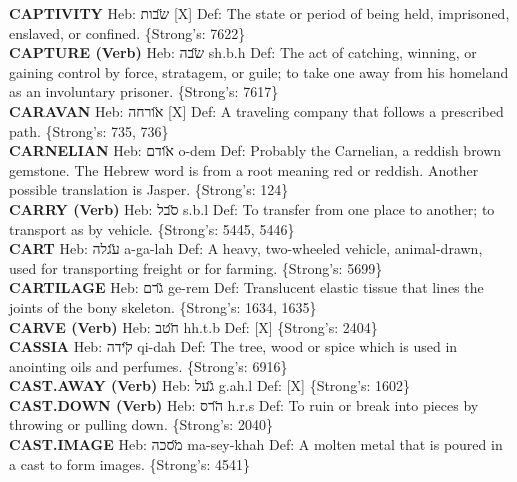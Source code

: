 {\textbf{CAPTIVITY} Heb: {\large\H שבות} {[}X{]} Def: The state or period of being held, imprisoned, enslaved, or confined. \{Strong's: 7622\}\hfill{}\\

\textbf{CAPTURE (Verb)} Heb: {\large\H שבה} sh.b.h Def: The act of catching, winning, or gaining control by force, stratagem, or guile; to take one away from his homeland as an involuntary prisoner. \{Strong's: 7617\}\hfill{}\\

\textbf{CARAVAN} Heb: {\large\H אורחה} {[}X{]} Def: A traveling company that follows a prescribed path. \{Strong's: 735, 736\}\hfill{}\\

\textbf{CARNELIAN} Heb: {\large\H אודם} o-dem Def: Probably the Carnelian, a reddish brown gemstone. The Hebrew word is from a root meaning red or reddish. Another possible translation is Jasper. \{Strong's: 124\}\hfill{}\\

\textbf{CARRY (Verb)} Heb: {\large\H סבל} s.b.l Def: To transfer from one place to another; to transport as by vehicle. \{Strong's: 5445, 5446\}\hfill{}\\

\textbf{CART} Heb: {\large\H עגלה} a-ga-lah Def: A heavy, two-wheeled vehicle, animal-drawn, used for transporting freight or for farming. \{Strong's: 5699\}\hfill{}\\

\textbf{CARTILAGE} Heb: {\large\H גרם} ge-rem Def: Translucent elastic tissue that lines the joints of the bony skeleton. \{Strong's: 1634, 1635\}\hfill{}\\

\textbf{CARVE (Verb)} Heb: {\large\H חטב} hh.t.b Def: {[}X{]} \{Strong's: 2404\}\hfill{}\\

\textbf{CASSIA} Heb: {\large\H קידה} qi-dah Def: The tree, wood or spice which is used in anointing oils and perfumes. \{Strong's: 6916\}\hfill{}\\

\textbf{CAST.AWAY (Verb)} Heb: {\large\H געל} g.ah.l Def: {[}X{]} \{Strong's: 1602\}\hfill{}\\

\textbf{CAST.DOWN (Verb)} Heb: {\large\H הרס} h.r.s Def: To ruin or break into pieces by throwing or pulling down. \{Strong's: 2040\}\hfill{}\\

\textbf{CAST.IMAGE} Heb: {\large\H מסכה} ma-sey-khah Def: A molten metal that is poured in a cast to form images. \{Strong's: 4541\}\hfill{}\\

}
